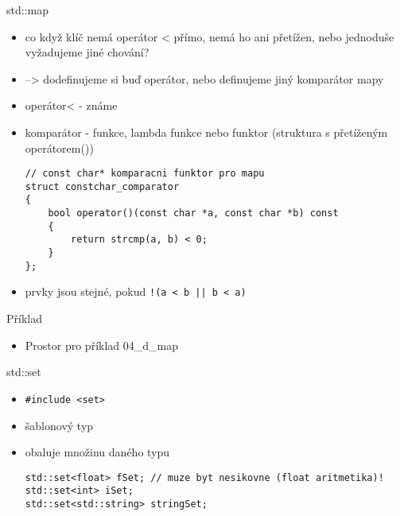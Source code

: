 \documentclass{beamer}
\begin{document}
\begin{xframe}{std::map}
	\begin{itemize}
		\item co když klíč nemá operátor < přímo, nemá ho ani přetížen, nebo jednoduše vyžadujeme jiné chování?
		\item --> dodefinujeme si buď operátor, nebo definujeme jiný komparátor mapy
		\item operátor< - známe
		\item komparátor - funkce, lambda funkce nebo funktor (struktura s přetíženým operátorem())
\begin{lstlisting}[basicstyle=\fontsize{8}{9}\selectfont\ttfamily]
// const char* komparacni funktor pro mapu
struct constchar_comparator
{
    bool operator()(const char *a, const char *b) const
    {
        return strcmp(a, b) < 0;
    }
};
\end{lstlisting}
		\item prvky jsou stejné, pokud \texttt{!(a < b || b < a)}
	\end{itemize}
\end{xframe}

\begin{xframe}{Příklad}
	\begin{itemize}
		\item Prostor pro příklad 04\_d\_map
	\end{itemize}
\end{xframe}



\begin{xframe}{std::set}
	\begin{itemize}
		\item \texttt{\#include <set>}
		\item šablonový typ
		\item obaluje množinu daného typu
\begin{lstlisting}[basicstyle=\fontsize{8}{9}\selectfont\ttfamily]
std::set<float> fSet; // muze byt nesikovne (float aritmetika)!
std::set<int> iSet;
std::set<std::string> stringSet;
\end{lstlisting}
	\end{itemize}
\end{xframe}
\end{document}
